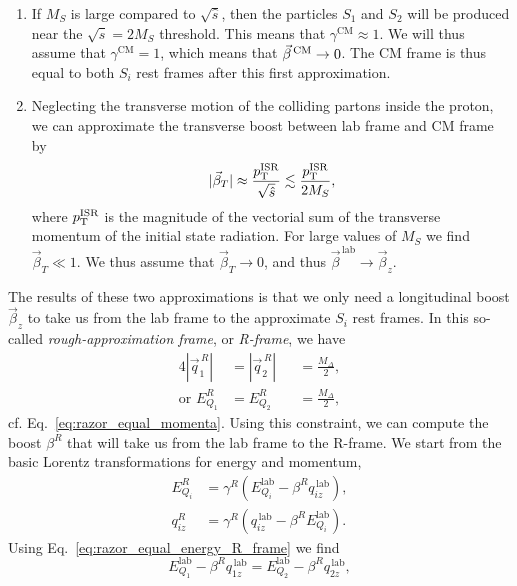 \begin{enumerate}
  \item If $M_S$ is large compared to $\sqrt{\hat{s}}$, then the particles $S_1$ and $S_2$ will be
produced near the $\sqrt{\hat{s}} = 2 M_S$ threshold. This means that $\gamma^{\textrm{CM}} \approx
1$. We will thus assume that $\gamma^{\textrm{CM}} = 1$, which means that $\vec{\beta}^{\,\textrm{CM}} \rightarrow 0$. 
The CM frame is thus equal to both $S_i$ rest frames after this first approximation. 
  \item Neglecting the transverse motion of the colliding partons inside the proton, we can
approximate the transverse boost between lab frame and CM frame by 
  \begin{equation}
    |\vec{\beta}_T| \approx \frac{p_{\mathrm{T}}^{\rm ISR}}{\sqrt{\hat{s}}} \lesssim \frac{p_{\mathrm{T}}^{\rm
ISR}}{2M_S},
  \end{equation}
  where $p_{\mathrm{T}}^{\rm ISR}$ is the magnitude of the vectorial sum of the transverse momentum of the
initial state radiation. For large values of $M_S$ we find $\vec{\beta}_T \ll 1$. We thus assume
that $\vec{\beta}_T \rightarrow 0$, and thus $\vec{\beta}^{\,\textrm{lab}} \rightarrow
\vec{\beta}_z$.
\end{enumerate}
The results of these two approximations is that we only need a longitudinal boost $\vec{\beta}_z$
to take us from the lab frame to the approximate $S_i$ rest frames. 
In this so-called \textit{rough-approximation frame}, or \textit{R-frame}, we have 
\begin{alignat}{4}
  |\vec{q}^{\,R}_1|         &= |\vec{q}^{\,R}_2| &&= \frac{M_\Delta}{2} , \\
  \textrm{or } E_{Q_1}^R &= E_{Q_2}^R     &&= \frac{M_\Delta}{2},
\label{eq:razor_equal_energy_R_frame}
\end{alignat}
cf. Eq.~\ref{eq:razor_equal_momenta}. Using this constraint, we can compute the boost $\beta^R$
that will take us from the lab frame to the R-frame. We start from the basic Lorentz
transformations for energy and momentum, 
\begin{align}
  E_{Q_i}^R      &= \gamma^R \left( E_{Q_i}^{\textrm{lab}} - \beta^R q_{iz}^{\,\textrm{lab}}
\right) , \\
  q_{iz}^R &= \gamma^R \left( q_{iz}^{\,\textrm{lab}} - \beta^R E_{Q_i}^{\textrm{lab}}
\right) .
\end{align}
Using Eq.~\ref{eq:razor_equal_energy_R_frame} we find
\begin{equation}
  E_{Q_1}^{\textrm{lab}} - \beta^R q_{1z}^{\,\textrm{lab}} = E_{Q_2}^{\textrm{lab}} - \beta^R
q_{2z}^{\,\textrm{lab}} ,
\end{equation}
